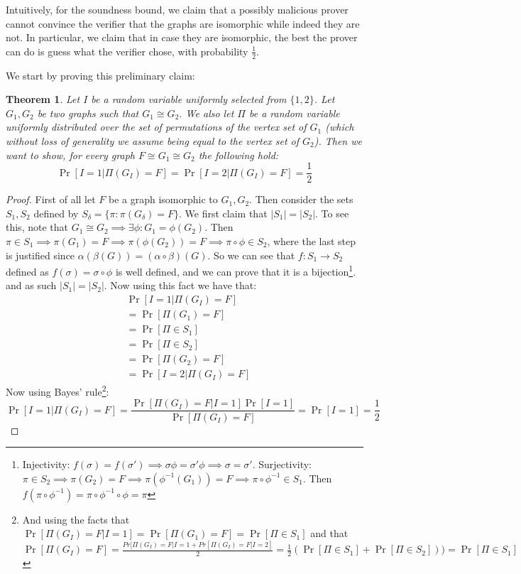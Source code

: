 \documentclass{article}
\newtheorem{theorem}{Theorem}
\begin{document}
Intuitively, for the soundness bound, we claim that a possibly malicious prover cannot convince the verifier that the graphs are isomorphic while indeed they are not. In particular, we claim that in case they are isomorphic, the best the prover can do is guess what the verifier chose, with probability $\frac{1}{2}$.

We start by proving this preliminary claim:

\begin{theorem}
Let $I$ be a random variable uniformly selected from $\{1, 2\}$. Let $G_1, G_2$ be two graphs such that $G_1 \cong G_2$. We also let $\Pi$ be a random variable uniformly distributed over the set of permutations of the vertex set of $G_1$ (which without loss of generality we assume being equal to the vertex set of $G_2$). Then we want to show, for every graph $F \cong G_1 \cong G_2$ the following hold:
\[ \Pr[I = 1 | \Pi(G_I) = F] = \Pr[I = 2 | \Pi(G_I) = F] = \frac{1}{2} \]
\end{theorem}
\begin{proof}
First of all let $F$ be a graph isomorphic to $G_1, G_2$. 
Then consider the sets $S_1, S_2$ defined by $S_\delta = \{ \pi : \pi(G_\delta) = F \}$. We first claim that $|S_1| = |S_2|$. To see this, note that $G_1 \cong G_2 \implies \exists \phi : G_1 = \phi(G_2) $. Then $\pi \in S_1 \implies \pi(G_1) = F \implies \pi(\phi(G_2)) = F \implies \pi \circ \phi \in S_2$, where the last step is justified since $\alpha(\beta(G)) = (\alpha \circ \beta) (G)$. So we can see that $f: S_1 \to S_2$ defined as $f(\sigma) = \sigma \circ \phi$ is well defined, and we can prove that it is a bijection\footnote{Injectivity: $f(\sigma) = f(\sigma') \implies \sigma \phi = \sigma' \phi \implies \sigma = \sigma'$. Surjectivity: $\pi \in S_2 \implies \pi(G_2) = F \implies \pi (\phi ^ {-1} (G_1)) = F \implies \pi \circ \phi^{-1} \in S_1$. Then $f(\pi \circ \phi^{-1}) = \pi \circ \phi^{-1} \circ \phi = \pi$}. and as such $|S_1| = |S_2|$. Now using this fact we have that:
\begin{align*}
    & \Pr[I = 1 | \Pi(G_I) = F] \\
    &= \Pr[\Pi(G_1) = F ]  \\
    &= \Pr[\Pi \in S_1] \\
    &= \Pr[\Pi \in S_2] \\
    &= \Pr[\Pi(G_2) = F ]  \\
    &= \Pr[I = 2 | \Pi(G_I) = F] 
\end{align*}
Now using Bayes' rule\footnote{And using the facts that $ \Pr[\Pi(G_I) = F | I = 1 ] = \Pr[\Pi(G_1) = F] = \Pr[\Pi \in S_1]$ and that 
$\Pr[\Pi(G_I) = F] = \frac{Pr[\Pi(G_I) = F | I = 1 + Pr[\Pi(G_I) = F | I = 2]}{2} = \frac{1}{2}(\Pr[\Pi \in S_1] + \Pr[\Pi \in S_2])) = \Pr[\Pi \in S_1]$}:
\[ \Pr[I = 1 | \Pi(G_I) = F] = \frac{\Pr[\Pi(G_I) = F | I = 1 ]\Pr[I = 1]}{\Pr[\Pi(G_I) = F]}  = \Pr[I = 1] = \frac{1}{2}\] 

\end{proof}
\end{document}

